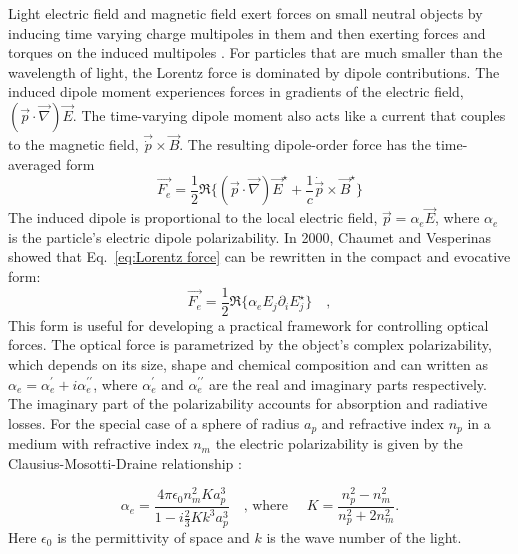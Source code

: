 Light electric field and magnetic field exert forces on small neutral objects by inducing time varying charge multipoles in them and then exerting forces and torques on the induced multipoles \cite{jackson_classical_1999,Chaumet:00, gordon1973, Dungey:91}. For particles that are much smaller than the wavelength of light, the Lorentz force is dominated by dipole contributions. The induced dipole moment experiences forces in gradients of the electric field,  $(\vec{p}\cdot \vec{\nabla})\vec{E}$. The time-varying dipole moment also acts like a current that couples to the magnetic field, $\vec{\dot{p}}\times \vec{B}$. The resulting dipole-order force has the time-averaged form \cite{gordon1973}
\begin{equation}
\label{eq:Lorentz force}
\vec{F_e}  = \frac{1}{2} \Re \lbrace (\vec{p}\cdot \vec{\nabla})\vec{E}^\star + \frac{1}{c} \dot{\vec{p}}\times \vec{B}^\star \rbrace 
\end{equation}
The induced dipole is proportional to the local electric field, $\vec{p} = \alpha _{e}\vec{E}$, where $\alpha _{e}$ is the particle's electric dipole polarizability. In 2000, Chaumet and Vesperinas \cite{Chaumet:00} showed that Eq.~\eqref{eq:Lorentz force} can be rewritten in the compact and evocative form:
\begin{equation}
\label{eq:chaumet force}
\vec{F_e} = \frac{1}{2} \Re \lbrace \alpha _{e} E_j \partial _i E^\star _{j} \rbrace \quad ,
\end{equation}
This form is useful for developing a practical framework for controlling optical forces. The optical force is parametrized by the object's complex polarizability, which depends on its size, shape and chemical composition and can written as $\alpha _e = \alpha^{\prime}_e + i \alpha ^{\prime \prime}_{e}$, where $\alpha ^{\prime}_{e}$ and $\alpha ^{\prime \prime}_{e}$ are the real and imaginary parts \cite{jackson_classical_1999} respectively. The imaginary part of the polarizability accounts for absorption and radiative losses. For the special case of a sphere of radius $a_p$ and refractive index $n_p$ in a medium with refractive index $n_m$ the electric polarizability is given by the Clausius-Mosotti-Draine relationship \cite{draine1993}:

\begin{equation}
\label{eq:clausius mosotti}
\alpha _e = \frac{4\pi \epsilon _0 n^2_m K a^3_p}{1-i\frac{2}{3}K k^3 a^3_p} \quad \text{, where }\quad K = \frac{n^2_p - n^2_m}{n^2_p + 2n^2_m}.
\end{equation}
Here $\epsilon _{0}$ is the permittivity of space and $k$ is the wave number of the light. 

